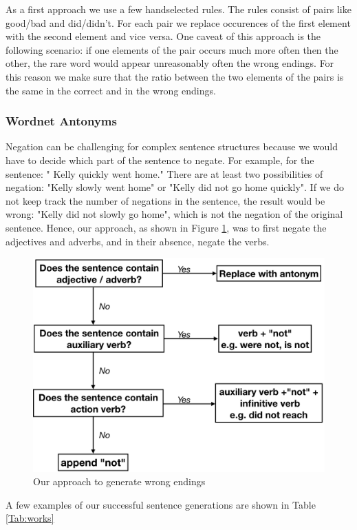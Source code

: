 \documentclass{article}
\begin{document}
As a first approach we use a few handselected rules. The rules consist of pairs like good/bad and did/didn't. For each pair we replace occurences of the first element with the second element and vice versa. One caveat of this approach is the following scenario: if one elements of the pair occurs much more often then the other, the rare word would appear unreasonably often the wrong endings. For this reason we make sure that the ratio between the two elements of the pairs is the same in the correct and in the wrong endings.


\subsubsection{Wordnet Antonyms}

Negation can be challenging for complex sentence structures because we would have to decide which part of the sentence to negate. For example, for the sentence: "
Kelly quickly went home." There are at least two possibilities of negation: "Kelly slowly went home" or "Kelly did not go home quickly". If we do not keep track the number of negations in the sentence, the result would be wrong: "Kelly did not slowly go home", which is not the negation of the original sentence. Hence, our approach, as shown in Figure \ref{Figure:wrong}, was to first negate the adjectives and adverbs, and in their absence, negate the verbs.

\begin{figure}
  \centering
  \includegraphics[width=0.7 \linewidth]{fig/wrong.png}
  \caption{Our approach to generate wrong endings}
  \label{Figure:wrong}
\end{figure}


A few examples of our successful sentence generations are shown in Table \ref{Tab:works}
\end{document}
